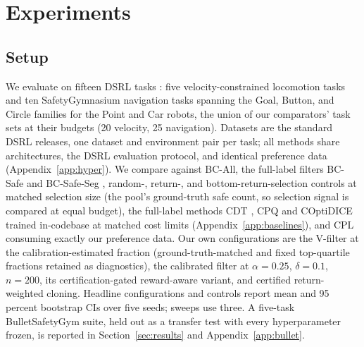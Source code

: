 \documentclass{article} %
\begin{document}
\section{Experiments}
\label{sec:experiments}

\subsection{Setup}
We evaluate on fifteen DSRL tasks \citep{liu2024dsrl}: five velocity-constrained locomotion tasks and ten SafetyGymnasium navigation tasks spanning the Goal, Button, and Circle families for the Point and Car robots, the union of our comparators' task sets at their budgets (20 velocity, 25 navigation). Datasets are the standard DSRL releases, one dataset and environment pair per task; all methods share architectures, the DSRL evaluation protocol, and identical preference data (Appendix~\ref{app:hyper}). We compare against BC-All, the full-label filters BC-Safe and BC-Safe-Seg \citep{liu2024dsrl, gong2026presa}, random-, return-, and bottom-return-selection controls at matched selection size (the pool's ground-truth safe count, so selection signal is compared at equal budget), the full-label methods CDT \citep{liu2023cdt}, CPQ \citep{xu2022cpq} and COptiDICE \citep{lee2022coptidice} trained in-codebase at matched cost limits (Appendix~\ref{app:baselines}), and CPL \citep{hejna2024cpl} consuming exactly our preference data. Our own configurations are the V-filter at the calibration-estimated fraction (ground-truth-matched and fixed top-quartile fractions retained as diagnostics), the calibrated filter at $\alpha = 0.25$, $\delta = 0.1$, $n = 200$, its certification-gated reward-aware variant, and certified return-weighted cloning. Headline configurations and controls report mean and 95 percent bootstrap CIs over five seeds; sweeps use three. A five-task BulletSafetyGym suite, held out as a transfer test with every hyperparameter frozen, is reported in Section~\ref{sec:results} and Appendix~\ref{app:bullet}.
\end{document}
